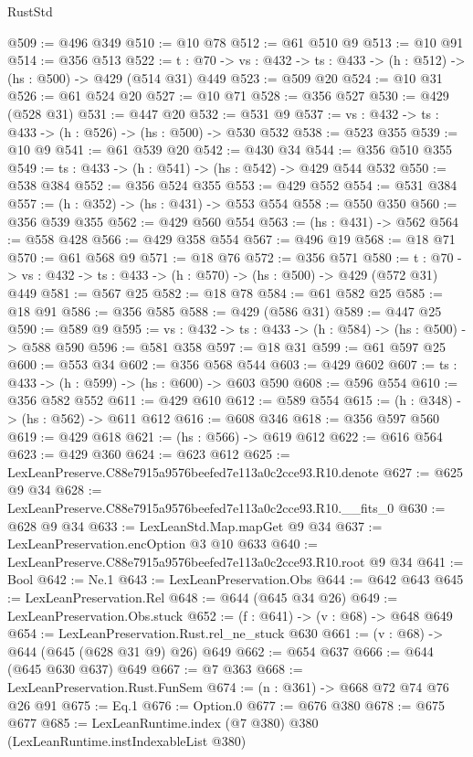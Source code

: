 \begin{lexlean}{RustStd}
\begin{coremodule}
@509 := @496 @349
@510 := @10 @78
@512 := @61 @510 @9
@513 := @10 @91
@514 := @356 @513
@522 := {t : @70} -> {vs : @432} -> {ts : @433} -> (h : @512) -> (hs : @500) -> @429 (@514 @31) @449
@523 := @509 @20
@524 := @10 @31
@526 := @61 @524 @20
@527 := @10 @71
@528 := @356 @527
@530 := @429 (@528 @31)
@531 := @447 @20
@532 := @531 @9
@537 := {vs : @432} -> {ts : @433} -> (h : @526) -> (hs : @500) -> @530 @532
@538 := @523 @355
@539 := @10 @9
@541 := @61 @539 @20
@542 := @430 @34
@544 := @356 @510 @355
@549 := {ts : @433} -> (h : @541) -> (hs : @542) -> @429 @544 @532
@550 := @538 @384
@552 := @356 @524 @355
@553 := @429 @552
@554 := @531 @384
@557 := (h : @352) -> (hs : @431) -> @553 @554
@558 := @550 @350
@560 := @356 @539 @355
@562 := @429 @560 @554
@563 := (hs : @431) -> @562
@564 := @558 @428
@566 := @429 @358 @554
@567 := @496 @19
@568 := @18 @71
@570 := @61 @568 @9
@571 := @18 @76
@572 := @356 @571
@580 := {t : @70} -> {vs : @432} -> {ts : @433} -> (h : @570) -> (hs : @500) -> @429 (@572 @31) @449
@581 := @567 @25
@582 := @18 @78
@584 := @61 @582 @25
@585 := @18 @91
@586 := @356 @585
@588 := @429 (@586 @31)
@589 := @447 @25
@590 := @589 @9
@595 := {vs : @432} -> {ts : @433} -> (h : @584) -> (hs : @500) -> @588 @590
@596 := @581 @358
@597 := @18 @31
@599 := @61 @597 @25
@600 := @553 @34
@602 := @356 @568 @544
@603 := @429 @602
@607 := {ts : @433} -> (h : @599) -> (hs : @600) -> @603 @590
@608 := @596 @554
@610 := @356 @582 @552
@611 := @429 @610
@612 := @589 @554
@615 := (h : @348) -> (hs : @562) -> @611 @612
@616 := @608 @346
@618 := @356 @597 @560
@619 := @429 @618
@621 := (hs : @566) -> @619 @612
@622 := @616 @564
@623 := @429 @360
@624 := @623 @612
@625 := LexLeanPreserve.C88e7915a9576beefed7e113a0c2cce93.R10.denote
@627 := @625 @9 @34
@628 := LexLeanPreserve.C88e7915a9576beefed7e113a0c2cce93.R10.__fits_0
@630 := @628 @9 @34
@633 := LexLeanStd.Map.mapGet @9 @34
@637 := LexLeanPreservation.encOption @3 @10 @633
@640 := LexLeanPreserve.C88e7915a9576beefed7e113a0c2cce93.R10.root @9 @34
@641 := Bool
@642 := Ne.{1}
@643 := LexLeanPreservation.Obs
@644 := @642 @643
@645 := LexLeanPreservation.Rel
@648 := @644 (@645 @34 @26)
@649 := LexLeanPreservation.Obs.stuck
@652 := (f : @641) -> (v : @68) -> @648 @649
@654 := LexLeanPreservation.Rust.rel_ne_stuck @630
@661 := (v : @68) -> @644 (@645 (@628 @31 @9) @26) @649
@662 := @654 @637
@666 := @644 (@645 @630 @637) @649
@667 := @7 @363
@668 := LexLeanPreservation.Rust.FunSem
@674 := (n : @361) -> @668 @72 @74 @76 @26 @91
@675 := Eq.{1}
@676 := Option.{0}
@677 := @676 @380
@678 := @675 @677
@685 := LexLeanRuntime.index (@7 @380) @380 (LexLeanRuntime.instIndexableList @380)

\end{coremodule}
\end{lexlean}

